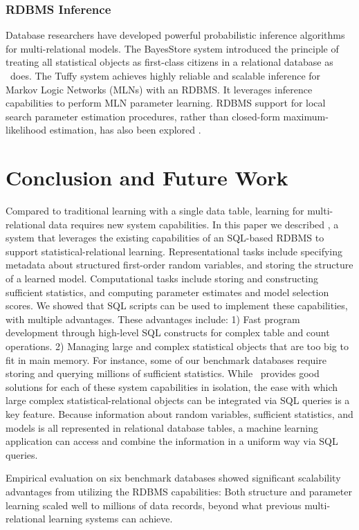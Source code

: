 \documentclass{IEEEtran}
\begin{document}
\subsubsection{RDBMS Inference} 
Database researchers have developed powerful probabilistic inference  algorithms for multi-relational models. 
 The BayesStore system \cite{Wang2008} introduced the principle of treating all statistical objects as first-class citizens in a relational database as \FB\ does. The Tuffy system \cite{Niu2011} achieves highly reliable and scalable inference for Markov Logic Networks (MLNs) with an RDBMS. It leverages inference capabilities to perform MLN parameter learning. RDBMS support for local search parameter estimation procedures, rather than closed-form maximum-likelihood estimation, has also been explored \cite{Feng_SIGMOD_2012,Niu2011,Niu2011a}.

\section{Conclusion and Future Work} 


Compared to traditional learning with a single data table, learning for multi-relational data requires new system capabilities. In this paper we described \FB, a system that leverages the existing capabilities of an SQL-based RDBMS to support statistical-relational learning.
Representational tasks include specifying metadata about structured first-order random variables, and storing the structure of a learned model. Computational tasks include storing and constructing sufficient statistics, and computing parameter estimates and model selection scores. 
We showed that SQL scripts can be used to implement these capabilities, with multiple advantages. These advantages include: 1) Fast program development through high-level SQL constructs for complex table and count operations. 2) Managing large and complex statistical objects that are too big to fit in main memory. 
For instance, some of our benchmark databases require storing and querying millions of sufficient statistics. While \FB\ provides good solutions for each of these system capabilities in isolation, the ease with which large complex statistical-relational objects can be integrated via SQL queries is a key feature. 
Because information about random variables, sufficient statistics, and models 
is all represented in relational database tables,
a machine learning application can access and combine the information in a uniform way via SQL queries.

Empirical evaluation on six benchmark databases showed significant scalability advantages from utilizing the RDBMS capabilities: Both structure and parameter learning scaled well to millions of data records, beyond what previous multi-relational learning systems can achieve. 
\end{document}
